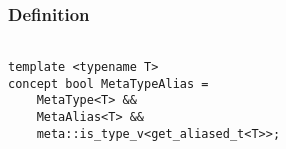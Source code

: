 
\subsubsection{Definition}

\begin{verbatim}

template <typename T>
concept bool MetaTypeAlias =
	MetaType<T> &&
	MetaAlias<T> &&
	meta::is_type_v<get_aliased_t<T>>;

\end{verbatim}

